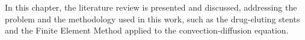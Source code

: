 In this chapter, the literature review is presented and discussed,
 addressing the problem and the methodology used in this work, 
such as the drug-eluting stents and 
the Finite Element Method applied to
 the convection-diffusion equation.
